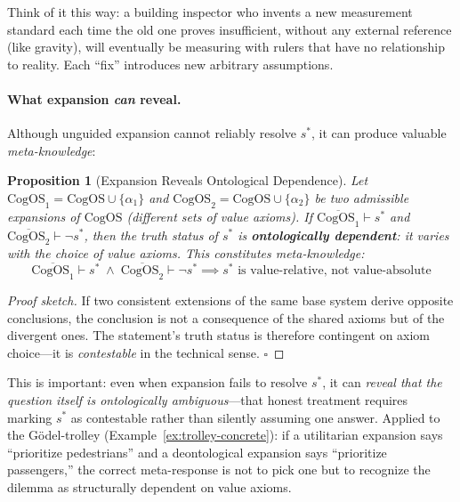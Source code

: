 \documentclass[11pt]{article}
\newtheorem{proposition}{Proposition}
\newcommand{\CogOS}{\text{CogOS}}
\begin{document}
\noindent Think of it this way: a building inspector who invents a new
measurement standard each time the old one proves insufficient, without any
external reference (like gravity), will eventually be measuring with rulers
that have no relationship to reality. Each ``fix'' introduces new arbitrary
assumptions.

\paragraph{What expansion \textit{can} reveal.}
Although unguided expansion cannot reliably resolve $s^*$, it can produce
valuable \textit{meta-knowledge}:

\begin{proposition}[Expansion Reveals Ontological Dependence]
\label{prop:meta-knowledge}
Let $\CogOS_1 = \CogOS \cup \{\alpha_1\}$ and
$\CogOS_2 = \CogOS \cup \{\alpha_2\}$ be two admissible expansions of
$\CogOS$ (different sets of value axioms). If
$\overline{\CogOS_1} \vdash s^*$ and $\overline{\CogOS_2} \vdash \neg s^*$,
then the truth status of $s^*$ is \textbf{ontologically dependent}: it varies
with the choice of value axioms. This constitutes meta-knowledge:
\begin{equation}
\overline{\CogOS_1} \vdash s^* \;\wedge\;
\overline{\CogOS_2} \vdash \neg s^*
\implies s^* \text{ is value-relative, not value-absolute}
\end{equation}
\end{proposition}

\begin{proof}[Proof sketch]
If two consistent extensions of the same base system derive opposite
conclusions, the conclusion is not a consequence of the shared axioms but of
the divergent ones. The statement's truth status is therefore contingent on
axiom choice---it is \textit{contestable} in the technical sense.
\hfill $\square$
\end{proof}

\noindent This is important: even when expansion fails to resolve $s^*$, it
can \textit{reveal that the question itself is ontologically ambiguous}---that
honest treatment requires marking $s^*$ as contestable rather than silently
assuming one answer. Applied to the G\"{o}del-trolley
(Example~\ref{ex:trolley-concrete}): if a utilitarian expansion says
``prioritize pedestrians'' and a deontological expansion says ``prioritize
passengers,'' the correct meta-response is not to pick one but to recognize
the dilemma as structurally dependent on value axioms.
\end{document}
